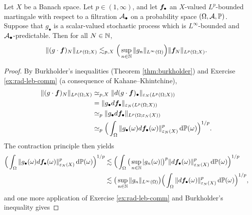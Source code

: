 \begin{thm}\label{thm:scalar-mgale-tf-bdd}
  Let $X$ be a Banach space.
  Let $p \in (1,\infty)$, and let $\bm{f}_{\bullet}$ an $X$-valued $L^p$-bounded martingale with respect to a filtration $\mathcal{A}_{\bullet}$ on a probability space $(\Omega,\mathcal{A},\mathbb{P})$.
  Suppose that $g_{\bullet}$ is a scalar-valued stochastic process which is $L^\infty$-bounded and $\mathcal{A}_{\bullet}$-predictable.
  Then for all $N \in \mathbb{N}$,
  \begin{equation*}
    \|(g \cdot \bm{f})_{N}\|_{L^p(\Omega;X)}
    \lesssim_{p,X} \Big(\sup_{n \in \mathbb{N}} \|g_{n}\|_{L^\infty(\Omega)} \Big) \|\bm{f}_{N}\|_{L^p(\Omega;X)}.
  \end{equation*}
\end{thm}

\begin{proof}
  By Burkholder's inequalities (Theorem \ref{thm:burkholder}) and Exercise \ref{ex:rad-leb-comm} (a consequence of Kahane--Khintchine), %
  \begin{equation*}
    \begin{aligned}
      \|(g \cdot \bm{f})_{N}\|_{L^p(\Omega;X)}
      &\simeq_{p,X} \|d(g \cdot \bm{f})_{\bullet}\|_{\varepsilon_{N}(L^p(\Omega;X))} \\
      &= \|g_{\bullet} d\bm{f}_{\bullet}\|_{\varepsilon_{N}(L^p(\Omega;X))} \\
      &\simeq_{p} \|g_{\bullet} d\bm{f}_{\bullet}\|_{L^p(\Omega;\varepsilon_{N}(X))} \\
      &\simeq_{p} \Big( \int_{\Omega} \|g_{\bullet}(\omega) d\bm{f}_{\bullet}(\omega)\|_{\varepsilon_{N}(X)}^{p} \, \mathrm{d}\mathbb{P}(\omega) \Big)^{1/p}.
    \end{aligned}
  \end{equation*}
  The contraction principle then yields
  \begin{equation*}
    \begin{aligned}
    \Big( \int_{\Omega} \|g_{\bullet}(\omega) d\bm{f}_{\bullet}(\omega)\|_{\varepsilon_{N}(X)}^{p} \, \mathrm{d}\mathbb{P}(\omega) \Big)^{1/p}
    &\lesssim \Big( \int_{\Omega} \big( \sup_{n \in \mathbb{N}} |g_{n}(\omega)| \big)^{p} \|d\bm{f}_{\bullet}(\omega)\|_{\varepsilon_{N}(X)}^{p} \, \mathrm{d}\mathbb{P}(\omega) \Big)^{1/p} \\
    &\lesssim \big( \sup_{n \in \mathbb{N}} \|g_{n}\|_{L^\infty(\Omega)} \big)  \Big( \int_{\Omega} \|d\bm{f}_{\bullet}(\omega)\|_{\varepsilon_{N}(X)}^{p} \, \mathrm{d}\mathbb{P}(\omega) \Big)^{1/p},
  \end{aligned}
\end{equation*}
and one more application of Exercise \ref{ex:rad-leb-comm} and Burkholder's inequality gives

\end{proof}
